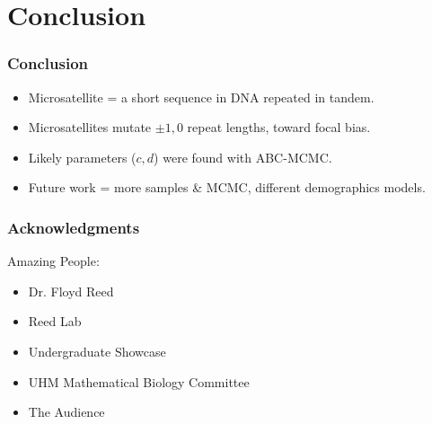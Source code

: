 \documentclass[11pt]{beamer}
\begin{document}
    \section{Conclusion}\label{sec:c}
    \begin{frame}
        \frametitle{Conclusion}
        \begin{itemize}
            \item Microsatellite = a short sequence in DNA repeated in tandem.\medskip
            \item Microsatellites mutate $\pm 1,0$ repeat lengths, toward focal bias.\medskip
            \item Likely parameters ($c, d$) were found with ABC-MCMC.\medskip
            \item Future work = more samples \& MCMC, different demographics models.
        \end{itemize}

    \end{frame}

    \begin{frame}
        \frametitle{Acknowledgments}
        \begin{block}{Amazing People:}
            \begin{itemize}
                \item Dr. Floyd Reed \smallskip
                \item Reed Lab \smallskip
                \item Undergraduate Showcase \smallskip
                \item UHM Mathematical Biology Committee \smallskip
                \item The Audience
            \end{itemize}
        \end{block}
    \end{frame}
\end{document}
